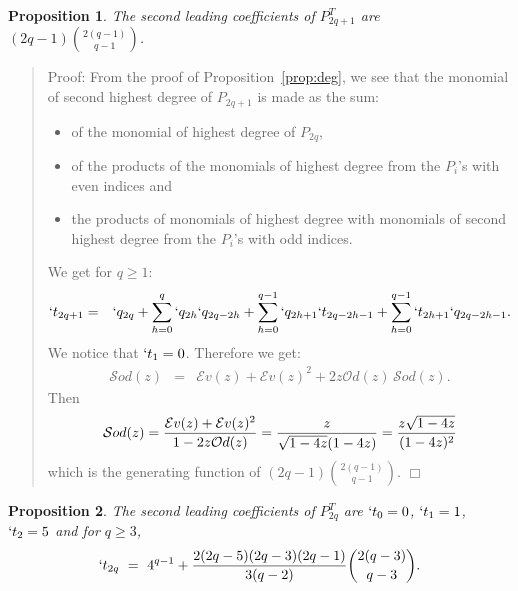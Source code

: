 \documentclass[preprint,authoryear]{elsarticle}
\newenvironment{proof}[1]{\begin{quotation}\noindent\textsf{Proof:} #1}{\(\Box\)\end{quotation}}
\newtheorem{prop}{Proposition}
\newcommand{\Od}{\mathcal{O}d}
\newcommand{\Sod}{\mathcal{S}od}
\newcommand{\Ev}{\mathcal{E}v}
\begin{document}
\begin{prop}
  The second leading coefficients of $P^T_{2q+1}$ are $(2q-1){ 2(q-1) \choose q-1}$.
\end{prop}
\begin{proof}{}
 From the proof of Proposition~\ref{prop:deg}, we see that the
  monomial of second highest degree of $P_{2q+1}$ is made as the sum:
  \begin{itemize}
  \item of the monomial of highest degree of $P_{2q}$,
  \item of the products of the
    monomials of highest degree from the $P_i$'s with even indices and
  \item the products of
    monomials of highest degree with monomials of second highest degree from the $P_i$'s
    with odd indices.
  \end{itemize}
We get for $q\ge 1$:
  \begin{eqnarray*}
    `t_{2q+1} &=& `q_{2q} + \sum_{h=0}^{q} `q_{2h}`q_{2q-2h} + \sum_{h=0}^{q-1} `q_{2h+1}
    `t_{2q-2h -1} + \sum_{h=0}^{q-1} `t_{2h+1} `q_{2q-2h-1}.
  \end{eqnarray*}
We notice that $`t_1=0$.  Therefore we get:
\begin{eqnarray*}
  \Sod(z) &=& \Ev(z) + \Ev(z)^2 + 2z \Od(z)\,\Sod(z).
\end{eqnarray*}
Then
\begin{displaymath}
   \Sod(z)  = \frac{\Ev(z)+\Ev(z)^2}{1-2z\Od(z)}\\
   =  \frac{z}{\sqrt{1-4z}(1-4z)} = \frac{z\sqrt{1-4z}}{(1-4z)^2}
\end{displaymath}
which is the generating function of $(2q-1){ 2(q-1) \choose q-1}$.
\end{proof}
\begin{prop}
  The second leading coefficients of $P^T_{2q}$ are $`t_0=0$, $ `t_1=1$, $`t_2= 5$ and for  $q\ge 3$,
 \begin{displaymath}
 `t_{2q} \ =\ 4^{q-1} + \frac{2 (2q - 5)  (2q - 3)  (2q -1)}{3(q-2)}  {2(q-3) \choose q-3}.
\end{displaymath}
\end{prop}
\end{document}
